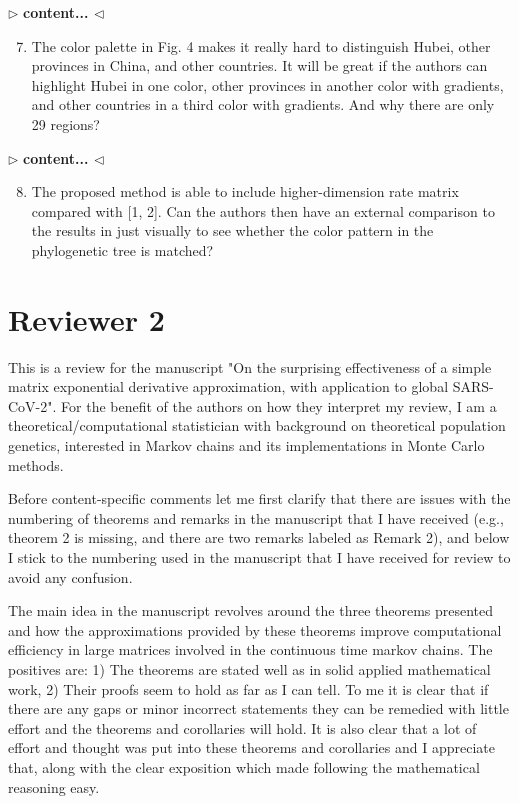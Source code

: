 \documentclass[12pt]{article}
\newenvironment{reply}{$\triangleright$\bfseries}{$\triangleleft$}
\begin{document}
\begin{reply}
content...
\end{reply}

\begin{enumerate}	
\setcounter{enumi}{6}	
	\item 
	The color palette in Fig. 4 makes it really hard to distinguish Hubei, other provinces in China, and other countries. It will be great if the authors can highlight Hubei in one color, other provinces in another color with gradients, and other countries in a third color with gradients. And why there are only 29 regions?
\end{enumerate}

\begin{reply}
content...
\end{reply}

\begin{enumerate}	
\setcounter{enumi}{7}	
	\item 
	The proposed method is able to include higher-dimension rate matrix compared with \citet{lemey2009bayesian,lemey2014unifying} [1, 2]. Can the authors then have an external comparison to the results in \citet{lemey2020accommodating} just visually to see whether the color pattern in the phylogenetic tree is matched?
\end{enumerate}



\section*{Reviewer 2}

This is a review for the manuscript "On the surprising effectiveness of a simple matrix exponential derivative approximation, with application to global SARS-CoV-2". 
For the benefit of the authors on how they interpret my review, I am a theoretical/computational statistician with background on theoretical population genetics, interested in Markov chains and its implementations in Monte Carlo methods. 

Before content-specific comments let me first clarify that there are issues with the numbering of theorems and remarks in the manuscript that I have received (e.g., theorem 2 is missing, and there are two remarks labeled as Remark 2), and below I stick to the numbering used in the manuscript that I have received for review to avoid any confusion. 

The main idea in the manuscript revolves around the three theorems presented and how the approximations provided by these theorems improve computational efficiency in large matrices involved in the continuous time markov chains. The positives are: 1) The theorems are stated well as in solid applied mathematical work, 2) Their proofs seem to hold as far as I can tell. 
To me it is clear that if there are any gaps or minor incorrect statements they can be remedied with little effort and the theorems and corollaries will hold. It is also clear that a lot of effort and thought was put into these theorems and corollaries and I appreciate that, along with the clear exposition which made following the mathematical reasoning easy. 
\end{document}
